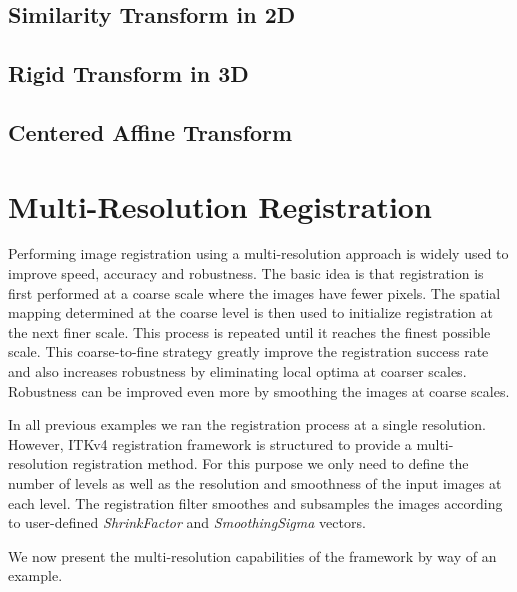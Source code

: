 \subsection{Similarity Transform in 2D}
\label{sec:SimilarityRegistrationIn2D}
\ifitkFullVersion

\fi



\subsection{Rigid Transform in 3D}
\label{sec:RigidRegistrationIn3D}
\ifitkFullVersion

\fi




\subsection{Centered Affine Transform}
\label{sec:CenteredAffineTransform}
\ifitkFullVersion

\fi




\section{Multi-Resolution Registration}
\label{sec:MultiResolutionRegistration}
Performing image registration using a multi-resolution approach is widely used
to improve speed, accuracy and robustness. The basic idea is that registration
is first performed at a coarse scale where the images have fewer pixels.
The spatial mapping determined at the coarse level is then used to initialize
registration at the next finer scale. This process is repeated until it
reaches the finest possible scale. This coarse-to-fine strategy greatly
improve the registration success rate and also increases robustness
by eliminating local optima at coarser scales. Robustness can be improved
even more by smoothing the images at coarse scales.

In all previous examples we ran the registration process at a single resolution. However,
ITKv4 registration framework is structured to provide a multi-resolution registration
method. For this purpose we only need to define the number of levels as well as the
resolution and smoothness of the input images at each level. The registration filter
smoothes and subsamples the images according to user-defined \emph{ShrinkFactor} and
\emph{SmoothingSigma} vectors.

We now present the multi-resolution capabilities of the framework by
way of an example.

